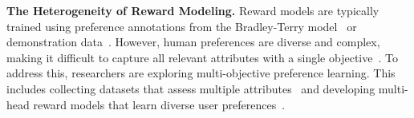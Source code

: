 \noindent\textbf{The Heterogeneity of Reward Modeling.} 
Reward models \cite{lambert2024rewardbench,liu2024skywork} are typically trained using preference annotations from the Bradley-Terry model~\citep{christiano2017deep,bradley1952rank} or demonstration data~\citep{wulfmeier2024imitating,xiao2024leverage}. However, human preferences are diverse and complex, making it difficult to capture all relevant attributes with a single objective~\citep{yang2024rewards,rame2024rewarded,chakraborty2024maxmin}. To address this, researchers are exploring multi-objective preference learning. This includes collecting datasets that assess multiple attributes~\citep{wu2023fine,wang2023helpsteer,cui2023ultrafeedback,pitis2024improving} and developing multi-head reward models that learn diverse user preferences~\citep{quan2024dmoerm,wang2024interpretable}.


